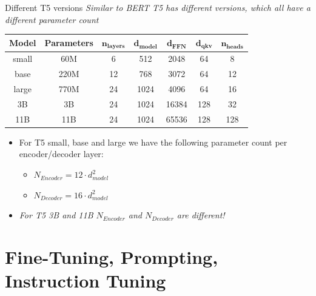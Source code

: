 \begin{frame}{Different T5 versions}
\textit{Similar to BERT T5 has different versions, which all have a different parameter count} 

\begin{table}[h!]
\centering
\small %
\begin{tabular}{|c|c|c|c|c|c|c|}
\hline
\textbf{Model} & \textbf{Parameters} & $\bm{n_{layers}}$ & $\bm{d_{model}}$ & $\bm{d_{FFN}}$ & $\bm{d_{qkv}}$ & $\bm{n_{heads}}$ \\ \hline
small  & 60M  & 6  & 512  & 2048 & 64 & 8 \\ \hline
base   & 220M & 12 & 768  & 3072 & 64 & 12 \\ \hline
large  & 770M & 24 & 1024 & 4096 & 64 & 16 \\ \hline
3B     & 3B   & 24 & 1024 & 16384 & 128 & 32 \\ \hline
11B    & 11B  & 24 & 1024 & 65536 & 128 & 128 \\ \hline
\end{tabular}
\end{table}

\begin{itemize}
    \item For T5 small, base and large we have the following parameter count per encoder/decoder layer:
    \begin{itemize}
        \item $N_{Encoder} = 12\cdot d_{model}^2$
        \item $N_{Decoder} = 16\cdot d_{model}^2$
    \end{itemize}
		\item \textit{For T5 3B and 11B $N_{Encoder}$ and $N_{Decoder}$ are different!}
\end{itemize}
    
\end{frame}

\section{Fine-Tuning, Prompting, Instruction Tuning}

